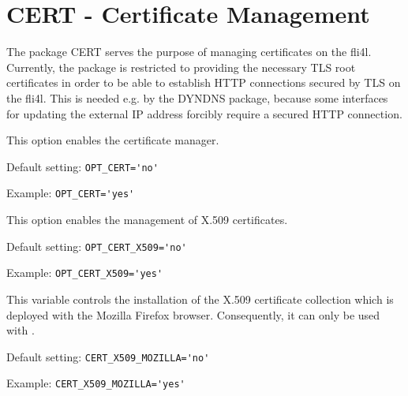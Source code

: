 {
\section{CERT - Certificate Management}
}

    The package CERT serves the purpose of managing certificates on the fli4l.
    Currently, the package is restricted to providing the necessary TLS root
    certificates in order to be able to establish HTTP connections secured by
    TLS on the fli4l. This is needed e.g. by the DYNDNS package, because some
    interfaces for updating the external IP address forcibly require a secured
    HTTP connection.

\begin{description}


    This option enables the certificate manager.

    Default setting: \verb+OPT_CERT='no'+

    Example: \verb+OPT_CERT='yes'+


    This option enables the management of X.509 certificates.


    Default setting: \verb+OPT_CERT_X509='no'+

    Example: \verb+OPT_CERT_X509='yes'+


    This variable controls the installation of the X.509 certificate collection
    which is deployed with the Mozilla Firefox browser. Consequently, it can
    only be used with .

    Default setting: \verb+CERT_X509_MOZILLA='no'+

    Example: \verb+CERT_X509_MOZILLA='yes'+

\end{description}
